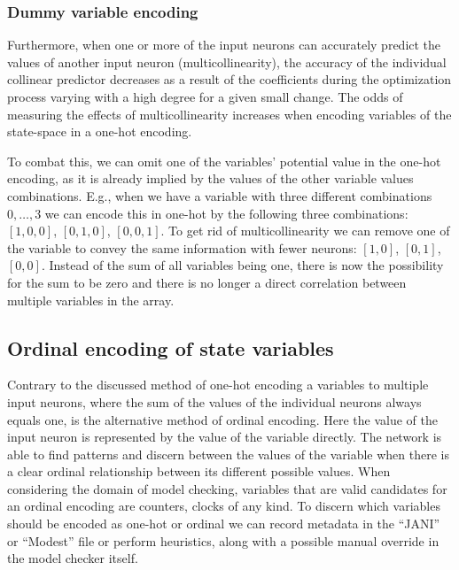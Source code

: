 \subsubsection{Dummy variable encoding}

Furthermore, when one or more of the input neurons can accurately predict the values of another input neuron (multicollinearity), the accuracy of the individual collinear predictor decreases as a result of the coefficients during the optimization process varying with a high degree for a given small change. The odds of measuring the effects of multicollinearity increases when encoding variables of the state-space in a one-hot encoding.

To combat this, we can omit one of the variables' potential value in the one-hot encoding, as it is already implied by the values of the other variable values combinations. E.g., when we have a variable with three different combinations $0, \dots, 3$ we can encode this in one-hot by the following three combinations: $[1, 0, 0]$, $[0, 1, 0]$, $[0, 0, 1]$. To get rid of multicollinearity we can remove one of the variable to convey the same information with fewer neurons: $[1, 0]$, $[0, 1]$, $[0, 0]$. Instead of the sum of all variables being one, there is now the possibility for the sum to be zero and there is no longer a direct correlation between multiple variables in the array.

\subsection{Ordinal encoding of state variables}

Contrary to the discussed method of one-hot encoding a variables to multiple input neurons, where the sum of the values of the individual neurons always equals one, is the alternative method of ordinal encoding. Here the value of the input neuron is represented by the value of the variable directly. The network is able to find patterns and discern between the values of the variable when there is a clear ordinal relationship between its different possible values. When considering the domain of model checking, variables that are valid candidates for an ordinal encoding are counters, clocks of any kind. To discern which variables should be encoded as one-hot or ordinal we can record metadata in the ``JANI'' or ``Modest'' file or perform heuristics, along with a possible manual override in the model checker itself.